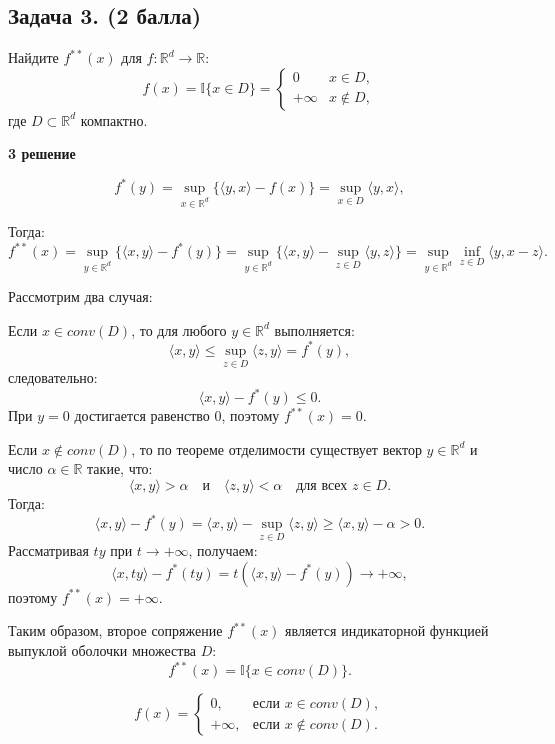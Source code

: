 \documentclass[12pt]{article}
\begin{document}
\subsection*{Задача 3. (2 балла)}
Найдите $ f^{**}(x) $ для $ f : \mathbb{R}^d \to \mathbb{R} $:
$$
f(x) = \mathbb{I}\{x \in D\} = 
\begin{cases} 
0 & x \in D, \\ 
+\infty & x \notin D,
\end{cases}
$$
где $ D \subset \mathbb{R}^d $ компактно.

\textbf{3 решение}


$$
f^*(y) = \sup_{x \in \mathbb{R}^d}  \{ \langle y, x \rangle - f(x)  \} = \sup_{x \in D} \langle y, x \rangle,
$$

Тогда:
$$
f^{**}(x) = \sup_{y \in \mathbb{R}^d}  \{ \langle x, y \rangle - f^*(y)  \} = \sup_{y \in \mathbb{R}^d}  \{ \langle x, y \rangle - \sup_{z \in D} \langle y, z \rangle  \} = \sup_{y \in \mathbb{R}^d} \inf_{z \in D} \langle y, x - z \rangle.
$$

Рассмотрим два случая:


Если $ x \in conv(D) $, то для любого $ y \in \mathbb{R}^d $ выполняется:
$$
\langle x, y \rangle \leq \sup_{z \in D} \langle z, y \rangle = f^*(y),
$$
следовательно:
$$
\langle x, y \rangle - f^*(y) \leq 0.
$$
При $ y = 0 $ достигается равенство $ 0 $, поэтому $ f^{**}(x) = 0 $.

Если $ x \notin conv(D) $, то по теореме отделимости существует вектор $ y \in \mathbb{R}^d $ и число $ \alpha \in \mathbb{R} $ такие, что:
$$
\langle x, y \rangle > \alpha \quad \text{и} \quad \langle z, y \rangle < \alpha \quad \text{для всех } z \in D.
$$
Тогда:
$$
\langle x, y \rangle - f^*(y) = \langle x, y \rangle - \sup_{z \in D} \langle z, y \rangle \geq \langle x, y \rangle - \alpha > 0.
$$
Рассматривая $ t y $ при $ t \to +\infty $, получаем:
$$
\langle x, t y \rangle - f^*(t y) = t  ( \langle x, y \rangle - f^*(y)  ) \to +\infty,
$$
поэтому $ f^{**}(x) = +\infty $.


Таким образом, второе сопряжение $ f^{**}(x) $ является индикаторной функцией выпуклой оболочки множества $ D $:
$$
f^{**}(x) = \mathbb{I}\{x \in conv(D)\}.
$$


$$
f(x) = 
\begin{cases} 
0, & \text{если } x \in conv(D), \\
+\infty, & \text{если } x \notin conv(D).
\end{cases}
$$
\end{document}
